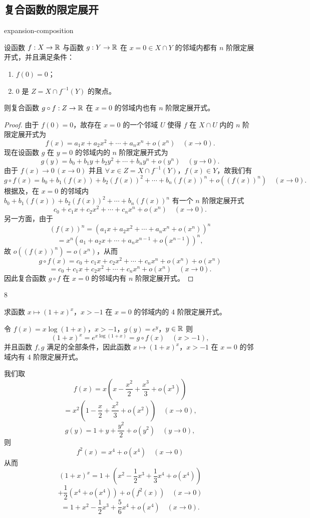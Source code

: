 \subsection{复合函数的限定展开}

\begin{mythm}{}{expansion-composition}

设函数 $f:X\to\mathbb{R}$ 与函数 $g:Y\to\mathbb{R}$ 在 $x=0\in X\cap Y$ 的邻域内都有 $n$ 阶限定展开式，并且满足条件：
\begin{enumerate}[label=\arabic{enumi})]
\item $f(0)=0$；
\item $0$ 是 $Z=X\cap f^{-1}(Y)$ 的聚点。
\end{enumerate}
则复合函数 $g\circ f:Z\to\mathbb{R}$ 在 $x=0$ 的邻域内也有 $n$ 阶限定展开式。

\end{mythm}

\begin{proof}

由于 $f(0)=0$，故存在 $x=0$ 的一个邻域 $U$ 使得 $f$ 在 $X\cap U$ 内的 $n$ 阶限定展开式为
\[f(x)=a_1x+a_2x^2+\cdots+a_nx^n+o(x^n)\quad(x\to0).\]
现在设函数 $g$ 在 $y=0$ 的邻域内的 $n$ 阶限定展开式为
\[g(y)=b_0+b_1y+b_2y^2+\cdots+b_ny^n+o(y^n)\quad(y\to0).\]
由于 $f(x)\to0\,(x\to0)$ 并且 $\forall\,x\in Z=X\cap f^{-1}(Y)$，$f(x)\in Y$，故我们有
\[g\circ f(x)=b_0+b_1(f(x))+b_2(f(x))^2+\cdots+b_n(f(x))^n+o((f(x))^n)\quad(x\to0).\]
根据及，在 $x=0$ 的邻域内 $b_0+b_1(f(x))+b_2(f(x))^2+\cdots+b_n(f(x))^n$ 有一个 $n$ 阶限定展开式
\[c_0+c_1x+c_2x^2+\cdots+c_nx^n+o(x^n)\quad(x\to0).\]
另一方面，由于
\[(f(x))^{n}=(a_1x+a_2x^2+\cdots+a_nx^n+o(x^n))^{n}\]
\[=x^{n}(a_1+a_2x+\cdots+a_nx^{n-1}+o(x^{n-1}))^{n},\]
故 $o((f(x))^{n})=o(x^{n})$，从而
\[g\circ f(x)=c_0+c_1x+c_2x^2+\cdots+c_nx^n+o(x^n)+o(x^n)\]
\[=c_0+c_1x+c_2x^2+\cdots+c_nx^n+o(x^n)\quad(x\to0).\]
因此复合函数 $g\circ f$ 在 $x=0$ 的邻域内有 $n$ 阶限定展开式。

\end{proof}

\begin{sourceexample}{8}

求函数 $x\longmapsto(1+x)^x$，$x>-1$ 在 $x=0$ 的邻域内的 $4$ 阶限定展开式。

令 $f(x)=x\log(1+x)$，$x>-1$，$g(y)=e^y$，$y\in\mathbb{R}$ 则
\[(1+x)^x=e^{x\log(1+x)}=g\circ f(x)\quad(x>-1),\]
并且函数 $f,g$ 满足的全部条件，因此函数 $x\longmapsto(1+x)^x$，$x>-1$ 在 $x=0$ 的邻域内有 $4$ 阶限定展开式。

我们取
\[f(x)=x\left(x-\frac{x^2}{2}+\frac{x^3}{3}+o(x^3)\right)\]
\[=x^2\left(1-\frac{x}{2}+\frac{x^2}{3}+o(x^2)\right)\quad(x\to0),\]
\[g(y)=1+y+\frac{y^2}{2}+o(y^2)\quad(y\to0),\]
则
\[f^2(x)=x^4+o(x^4)\quad(x\to0)\]
从而
\[(1+x)^{x}=1+\left(x^{2}-\frac{1}{2}x^{3}+\frac{1}{3}x^{4}+o(x^{4})\right)\]
\[+\frac{1}{2}(x^{4}+o(x^{4}))+o(f^{2}(x))\quad(x\to0)\]
\[=1+x^{2}-\frac{1}{2}x^{3}+\frac{5}{6}x^{4}+o(x^{4})\quad(x\to0).\]

\end{sourceexample}

